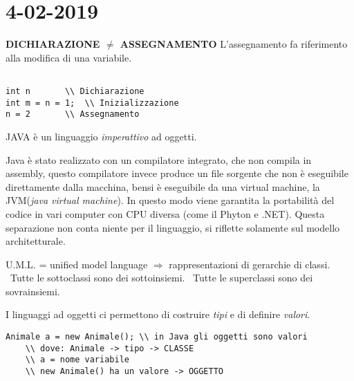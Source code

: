 

\newpage
\section{4-02-2019}
\textbf{DICHIARAZIONE $\neq$ ASSEGNAMENTO} \newline
L'assegnamento fa riferimento alla modifica di una variabile.
\begin{lstlisting}[basicstyle=\small,]

int n		\\ Dichiarazione
int m = n = 1; 	\\ Inizializzazione
n = 2 		\\ Assegnamento

\end{lstlisting}
JAVA è un linguaggio \textit{imperattivo} ad oggetti.

\noindent Java è stato realizzato con un compilatore integrato, che non compila in assembly, questo compilatore invece produce un file sorgente che non è eseguibile direttamente dalla macchina, bensi è eseguibile da una virtual machine, la JVM(\textit{java virtual machine}). In questo modo viene garantita la portabilità del codice in vari computer con CPU diversa (come il Phyton e .NET). \newline
Questa separazione non conta niente per il linguaggio, si riflette solamente sul modello architetturale.

\noindent U.M.L. = unified model language $\Rightarrow$ rappresentazioni di gerarchie di classi. \newline
{} \newline
\textbullet\ Tutte le sottoclassi sono dei sottoinsiemi. \newline
\textbullet\ Tutte le superclassi sono dei sovrainsiemi. 

\noindent I linguaggi ad oggetti ci permettono di costruire \textit{tipi} e di definire \textit{valori}. 
\begin{lstlisting}[basicstyle=\small,]
	Animale a = new Animale(); \\ in Java gli oggetti sono valori
	\\ dove: Animale -> tipo -> CLASSE
	\\ a = nome variabile
	\\ new Animale() ha un valore -> OGGETTO
\end{lstlisting}

